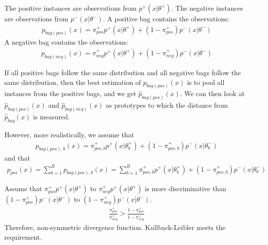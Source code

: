 The positive instances are observations from $p^+(x|\theta^+)$. 
The negative instances are observations from $p^-(x|\theta^-)$. 
A positive bag contains the observations:
\begin{align}
  p_{bag(pos)}(x) = \pi_{pos}^+ p^+(x|\theta^+) + (1-\pi_{pos}^+) p^-(x|\theta^-)
\end{align}
A negative bag contains the observations:
\begin{align}
  p_{bag(neg)}(x) = \pi_{neg}^+ p^+(x|\theta^+) + (1-\pi_{neg}^+) p^-(x|\theta^-)
\end{align}

If all positive bags follow the same distribution and all negative bags follow the same distribution, then the best estimation of $p_{bag(pos)}(x)$ is to pool all instances from the positive bags, and we get $\hat{p}_{bag(pos)}(x)$.
We can then look at $\hat{p}_{bag(pos)}(x)$ and $\hat{p}_{bag(neg)}(x)$ as prototypes to which the distance from $\hat{p}_{bag}(x)$ is measured.

However, more realistically, we assume that 
\begin{align}
  p_{bag(pos),b}(x) = \pi_{pos,b}^+ p^+(x|\theta^+_b) + (1-\pi_{pos,b}^+) p^-(x|\theta^-_b)
\end{align}
and that 
\begin{align}
  p_{pos}(x) = \sum_{b=1}^B p_{bag(pos),b}(x) = \sum_{b=1}^B \pi_{pos,b}^+ p^+(x|\theta^+_b) + (1-\pi_{pos,b}^+) p^-(x|\theta^-_b)
\end{align}


Assume that $\pi_{pos}^+ p^+(x|\theta^+)$ to $\pi_{neg}^+ p^+(x|\theta^+)$ is more discriminative than $(1-\pi_{pos}^+) p^-(x|\theta^-)$
to $(1-\pi_{neg}^+) p^-(x|\theta^-)$. 
\begin{align}
  \frac{\pi_{pos}^+}{\pi_{neg}^+} > \frac{1-\pi_{pos}^+}{1-\pi_{neg}^+} 
\end{align}
Therefore, non-symmetric divergence function. 
Kullback-Leibler meets the requirement.